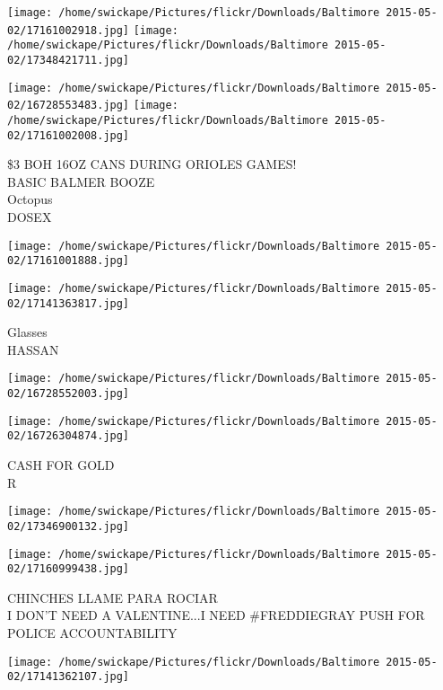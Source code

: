 \documentclass[10pt,letterpaper]{article}
\begin{document}
\texttt{[image: /home/swickape/Pictures/flickr/Downloads/Baltimore 2015-05-02/17161002918.jpg]}
\texttt{[image: /home/swickape/Pictures/flickr/Downloads/Baltimore 2015-05-02/17348421711.jpg]}

\texttt{[image: /home/swickape/Pictures/flickr/Downloads/Baltimore 2015-05-02/16728553483.jpg]}
\texttt{[image: /home/swickape/Pictures/flickr/Downloads/Baltimore 2015-05-02/17161002008.jpg]}

\$3 BOH 16OZ CANS DURING ORIOLES GAMES!\\
BASIC BALMER BOOZE\\
Octopus\\
DOSEX\\
\pagebreak

\texttt{[image: /home/swickape/Pictures/flickr/Downloads/Baltimore 2015-05-02/17161001888.jpg]}

\vspace{0.25in}
\texttt{[image: /home/swickape/Pictures/flickr/Downloads/Baltimore 2015-05-02/17141363817.jpg]}

Glasses\\
HASSAN\\
\pagebreak

\texttt{[image: /home/swickape/Pictures/flickr/Downloads/Baltimore 2015-05-02/16728552003.jpg]}

\vspace{0.25in}
\texttt{[image: /home/swickape/Pictures/flickr/Downloads/Baltimore 2015-05-02/16726304874.jpg]}

CASH FOR GOLD\\
R\\
\pagebreak

\texttt{[image: /home/swickape/Pictures/flickr/Downloads/Baltimore 2015-05-02/17346900132.jpg]}

\vspace{0.25in}
\texttt{[image: /home/swickape/Pictures/flickr/Downloads/Baltimore 2015-05-02/17160999438.jpg]}

CHINCHES LLAME PARA ROCIAR\\
I DON'T NEED A VALENTINE...I NEED \#FREDDIEGRAY PUSH FOR POLICE ACCOUNTABILITY\\
\pagebreak

\texttt{[image: /home/swickape/Pictures/flickr/Downloads/Baltimore 2015-05-02/17141362107.jpg]}
\end{document}
